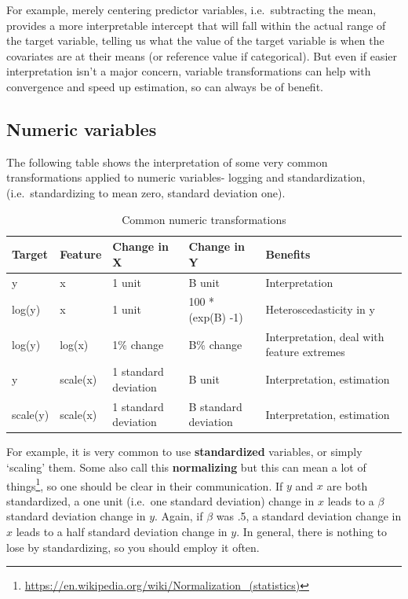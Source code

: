 \documentclass[
  letterpaper,
]{krantz}
\DeclareRobustCommand{\href}[2]{#2\footnote{\url{#1}}}
\begin{document}
For example, merely centering predictor variables, i.e.~subtracting the
mean, provides a more interpretable intercept that will fall within the
actual range of the target variable, telling us what the value of the
target variable is when the covariates are at their means (or reference
value if categorical). But even if easier interpretation isn't a major
concern, variable transformations can help with convergence and speed up
estimation, so can always be of benefit.

\subsection{Numeric variables}\label{numeric-variables}

The following table shows the interpretation of some very common
transformations applied to numeric variables- logging and
standardization, (i.e.~standardizing to mean zero, standard deviation
one).

\begin{longtable}{lllll}

\caption{\label{tbl-transformation}Common numeric transformations}

\tabularnewline

\toprule
Target & Feature & Change in X & Change in Y & Benefits \\ 
\midrule\addlinespace[2.5pt]
y & x & 1 unit & B unit & Interpretation \\ 
log(y) & x & 1 unit & 100 * (exp(B) -1)  & Heteroscedasticity in y \\ 
log(y) & log(x) & 1\% change & B\% change & Interpretation, deal with feature extremes \\ 
y & scale(x) & 1 standard deviation & B unit & Interpretation, estimation \\ 
scale(y) & scale(x) & 1 standard deviation & B standard deviation & Interpretation, estimation \\ 
\bottomrule

\end{longtable}

For example, it is very common to use \textbf{standardized} variables,
or simply `scaling' them. Some also call this \textbf{normalizing} but
\href{https://en.wikipedia.org/wiki/Normalization_(statistics)}{this can
mean a lot of things}, so one should be clear in their communication. If
\(y\) and \(x\) are both standardized, a one unit (i.e.~one standard
deviation) change in \(x\) leads to a \(\beta\) standard deviation
change in \(y\). Again, if \(\beta\) was .5, a standard deviation change
in \(x\) leads to a half standard deviation change in \(y\). In general,
there is nothing to lose by standardizing, so you should employ it
often.
\end{document}
